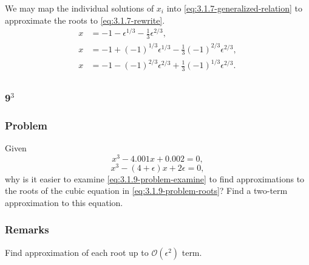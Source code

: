 \documentclass[12pt]{article}
\begin{document}
We may map the individual solutions of $x_i$ into
\cref{eq:3.1.7-generalized-relation} to approximate the roots to
\cref{eq:3.1.7-rewrite}.
\begin{equation*}
  \boxed{
    \begin{aligned}
      x &= -1 - \epsilon^{1/3} - \frac{1}{3}\epsilon^{2/3}, \\
      x &= -1 + {(-1)}^{1/3}\epsilon^{1/3} - \frac{1}{3}{(-1)}^{2/3}\epsilon^{2/3}, \\
      x &= -1 - {(-1)}^{2/3}\epsilon^{2/3} + \frac{1}{3}{(-1)}^{1/3}\epsilon^{2/3}. \\
    \end{aligned}
  }
\end{equation*}

\subsubsection{9$^3$}
\subsubsection*{Problem}
Given
\begin{equation}
  \label{eq:3.1.9-problem-roots}
  x^3-4.001x+0.002=0,
\end{equation}
\begin{equation}
  \label{eq:3.1.9-problem-examine}
  x^3-(4+\epsilon)x+2\epsilon=0,
\end{equation}
why is it easier to examine \cref{eq:3.1.9-problem-examine} to find
approximations to the roots of the cubic equation in
\cref{eq:3.1.9-problem-roots}? Find a two-term approximation to this equation.
\subsubsection*{Remarks}
Find approximation of each root up to $\mathcal{O}(\epsilon^2)$ term.
\end{document}
